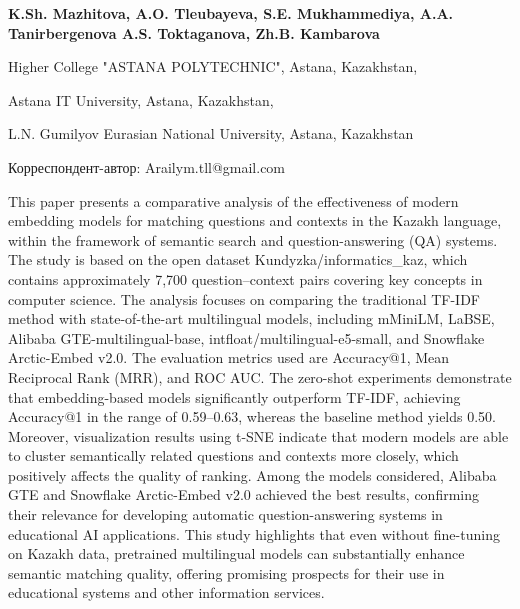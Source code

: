 
\begin{header}

{\bfseries
{}K.Sh. Mazhitova,
A.O. Tleubayeva\envelope,
S.E. Mukhammediya,
A.A. Tanirbergenova
A.S. Toktaganova,
Zh.B. Kambarova
}
\end{header}

\begin{affil}
Higher College "ASTANA POLYTECHNIC", Astana, Kazakhstan,

Astana IT University, Astana, Kazakhstan,

L.N. Gumilyov Eurasian National University, Astana, Kazakhstan

\envelope Корреспондент-автор: Arailym.tll@gmail.com
\end{affil}

This paper presents a comparative analysis of the effectiveness of
modern embedding models for matching questions and contexts in the
Kazakh language, within the framework of semantic search and
question-answering (QA) systems. The study is based on the open dataset
Kundyzka/informatics\_kaz, which contains approximately 7,700
question--context pairs covering key concepts in computer science. The
analysis focuses on comparing the traditional TF-IDF method with
state-of-the-art multilingual models, including mMiniLM, LaBSE, Alibaba
GTE-multilingual-base, intfloat/multilingual-e5-small, and Snow\-flake
Arctic-Embed v2.0. The evaluation metrics used are Accuracy@1, Mean
Reciprocal Rank (MRR), and ROC AUC. The zero-shot experiments
demonstrate that embedding-based models significantly out\-perform TF-IDF,
achieving Accuracy@1 in the range of 0.59--0.63, whereas the baseline
method yields 0.50. Moreover, visualization results using t-SNE indicate
that modern models are able to cluster semantic\-ally related questions
and contexts more closely, which positively affects the quality of
ranking. Among the models considered, Alibaba GTE and Snowflake
Arctic-Embed v2.0 achieved the best results, confirm\-ing their relevance
for developing automatic question-answering systems in educational AI
applications. This study highlights that even without fine-tuning on
Kazakh data, pretrained multilingual models can substantially enhance
semantic matching quality, offering promising prospects for their use in
educational systems and other information services.

